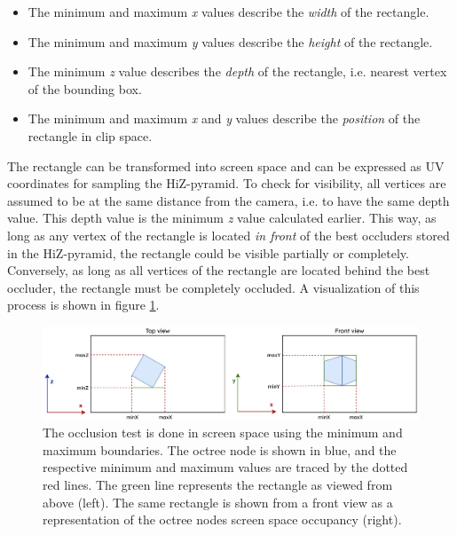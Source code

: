 \begin{itemize}
    \item The minimum and maximum \emph{x} values describe the \emph{width} of the rectangle.
    \item The minimum and maximum \emph{y} values describe the \emph{height} of the rectangle.
    \item The minimum \emph{z} value describes the \emph{depth} of the rectangle, i.e. nearest vertex of the bounding box.
    \item The minimum and maximum \emph{x} and \emph{y} values describe the \emph{position} of the rectangle in clip space.
\end{itemize}

The rectangle can be transformed into screen space and can be expressed as UV coordinates for sampling the 
\ac{HiZ}-pyramid. To check for visibility, all vertices are assumed to be at the same distance from the camera,
i.e. to have the same depth value. This depth value is the minimum \emph{z} value calculated earlier. This way,
as long as any vertex of the rectangle is located \emph{in front} of the best occluders stored in the 
\ac{HiZ}-pyramid, the rectangle could be visible partially or completely. Conversely, as long as all vertices of 
the rectangle are located behind the best occluder, the rectangle must be completely occluded. A visualization of 
this process is shown in figure \ref{fig:screen-space-occlusion-test}.

\begin{figure}[h]
    \centering
    \includegraphics[width=\linewidth]{images/graphics/screen_space_occlusion_test.jpg}
    \caption{The occlusion test is done in screen space using the minimum and maximum boundaries. The octree node 
    is shown in blue, and the respective minimum and maximum values are traced by the dotted red lines. The green 
    line represents the rectangle as viewed from above (left). The same rectangle is shown from a front view as a 
    representation of the octree nodes screen space occupancy (right).}
    \label{fig:screen-space-occlusion-test}
\end{figure}

